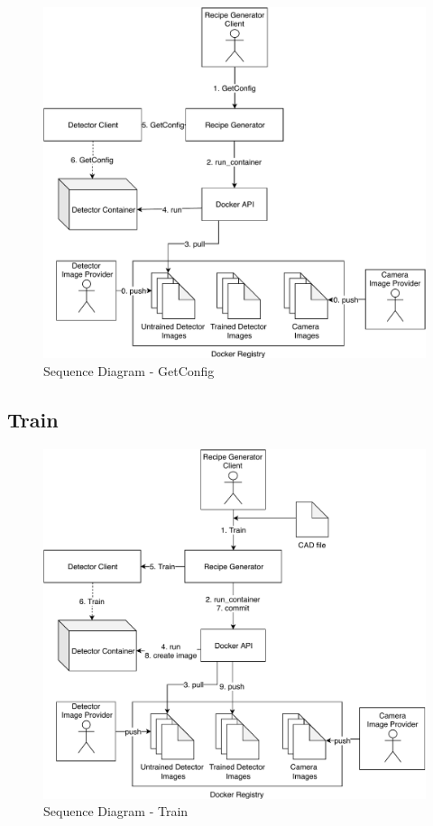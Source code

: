 \begin{figure}[ht]
	\centering
  \includegraphics[width=\textwidth]{img/SequenceDiagram-GetConfig.pdf}
	\caption{Sequence Diagram - GetConfig}
	\label{fig:SequenceDiagram-GetConfig}
\end{figure}

\subsection{Train}
\begin{figure}[ht]
	\centering
  \includegraphics[width=\textwidth]{img/SequenceDiagram-Train.pdf}
	\caption{Sequence Diagram - Train}
	\label{fig:SequenceDiagram-Train}
\end{figure}

